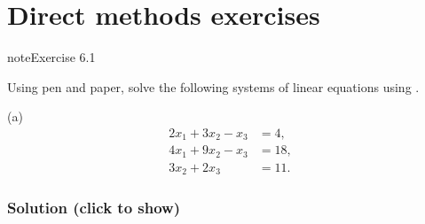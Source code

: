 \documentclass[letterpaper,10pt,english]{jupyterBook}
\begin{document}
\section{Direct methods exercises}
\label{\detokenize{6_Direct_methods/6.6_Direct_methods_exercises:direct-methods-exercises}}\label{\detokenize{6_Direct_methods/6.6_Direct_methods_exercises::doc}}
\begin{sphinxadmonition}{note}{Exercise 6.1}

\sphinxAtStartPar
Using pen and paper, solve the following systems of linear equations using {\hyperref[\detokenize{6_Direct_methods/6.1_LU_decomposition:lu-definition}]{}}.

\sphinxAtStartPar
(a)
\begin{align*}
    2 x_1 + 3 x_2 -   x_3   &=  4,\\
    4 x_1 + 9 x_2 -   x_3   &= 18,\\
            3 x_2 + 2 x_3 &= 11.
\end{align*}\subsubsection*{Solution (click to show)}


\end{sphinxadmonition}
\end{document}
